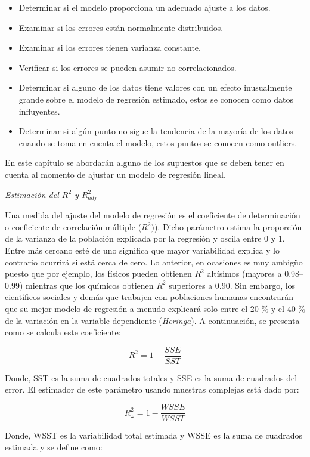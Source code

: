 \documentclass[
  12pt,
]{book}
\providecommand{\tightlist}{%
  \setlength{\itemsep}{0pt}\setlength{\parskip}{0pt}}
\begin{document}
\begin{itemize}
\tightlist
\item
  Determinar si el modelo proporciona un adecuado ajuste a los datos.
\item
  Examinar si los errores están normalmente distribuidos.
\item
  Examinar si los errores tienen varianza constante.
\item
  Verificar si los errores se pueden asumir no correlacionados.
\item
  Determinar si alguno de los datos tiene valores con un efecto inusualmente grande sobre el modelo de regresión estimado, estos se conocen
  como datos influyentes.
\item
  Determinar si algún punto no sigue la tendencia de la mayoría de los
  datos cuando se toma en cuenta el modelo, estos puntos se conocen como outliers.
\end{itemize}

En este capítulo se abordarán alguno de los supuestos que se deben tener en cuenta al momento de ajustar un modelo de regresión lineal.

\emph{Estimación del \(R^{2}\) y \(R_{adj}^{2}\)}

Una medida del ajuste del modelo de regresión es el coeficiente de determinación o coeficiente de correlación múltiple (\(R^{2})\)). Dicho parámetro estima la proporción de la varianza de la población explicada por la regresión y oscila entre 0 y 1. Entre más cercano esté de uno significa que mayor variabilidad explica y lo contrario ocurrirá si está cerca de cero. Lo anterior, en ocasiones es muy ambigüo puesto que por ejemplo, los físicos pueden obtienen \(R^{2}\) altísimos (mayores a 0.98--0.99) mientras que los químicos obtienen \(R^{2}\) superiores a 0.90. Sin embargo, los científicos sociales y demás que trabajen con poblaciones humanas encontrarán que su mejor modelo de regresión a menudo explicará solo entre el 20 \% y el 40 \% de la variación en la variable dependiente (\emph{Heringa}). A continuación, se presenta como se calcula este coeficiente:

\[
R^{2} =  1-\frac{SSE}{SST}
\]

Donde, SST es la suma de cuadrados totales y SSE es la suma de cuadrados del error. El estimador de este parámetro usando muestras complejas está dado por:

\[
R_{\omega}^{2} = 1-\frac{WSSE}{WSST}
\]

Donde, WSST es la variabilidad total estimada y WSSE es la suma de cuadrados estimada y se define como:
\end{document}
